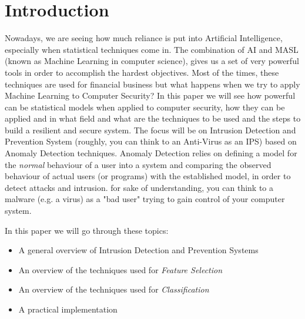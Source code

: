 \chapter{Introduction}
	
Nowadays, we are seeing how much reliance is put into Artificial Intelligence, especially when statistical techniques come in.\newline
The combination of AI and MASL (known as Machine Learning in computer science), gives us a set of very powerful tools in order to accomplish the hardest objectives. Most of the times, these techniques are used for financial business but what happens when we try to apply Machine Learning to Computer Security?\newline
In this paper we will see how powerful can be statistical models when applied to computer security, how they can be applied and in what field and what are the techniques to be used and the steps to build a resilient and secure system.\newline
The focus will be on Intrusion Detection and Prevention System (roughly, you can think to an Anti-Virus as an IPS) based on Anomaly Detection techniques.\newline
Anomaly Detection relies on defining a model for the \emph{normal} behaviour of a user into a system and comparing the observed behaviour of actual users (or programs) with the established model, in order to detect attacks and intrusion. for sake of understanding, you can think to a malware (e.g. a virus) as a "bad user" trying to gain control of your computer system.\newline\newline

In this paper we will go through these topics:
\begin{itemize}
	\item A general overview of Intrusion Detection and Prevention Systems
	\item An overview of the techniques used for \emph{Feature Selection}
	\item An overview of the techniques used for \emph{Classification}
	\item A practical implementation
\end{itemize}

